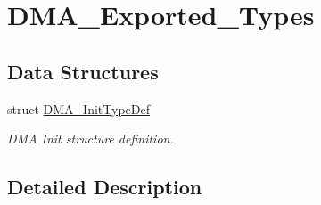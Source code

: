 \hypertarget{group___d_m_a___exported___types}{}\section{D\+M\+A\+\_\+\+Exported\+\_\+\+Types}
\label{group___d_m_a___exported___types}
\subsection*{Data Structures}
\begin{DoxyCompactItemize}
\item 
struct \mbox{\hyperlink{struct_d_m_a___init_type_def}{D\+M\+A\+\_\+\+Init\+Type\+Def}}
\begin{DoxyCompactList}\small\item\em D\+MA Init structure definition. \end{DoxyCompactList}\end{DoxyCompactItemize}


\subsection{Detailed Description}
